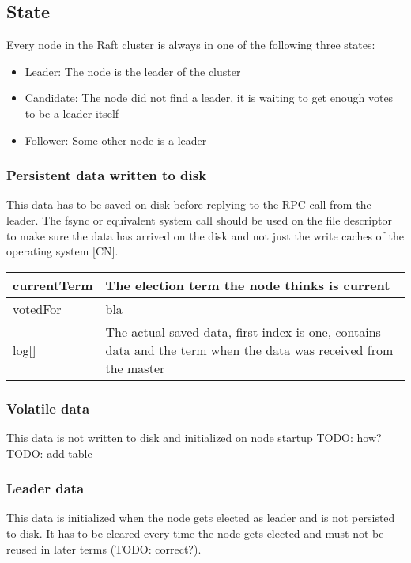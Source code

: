\subsection{State}
Every node in the Raft cluster is always in one of the following three states:
\begin{itemize}
    \item Leader: The node is the leader of the cluster
    \item Candidate: The node did not find a leader, it is waiting to get enough votes to be a leader itself
    \item Follower: Some other node is a leader
\end{itemize}

\subsubsection*{Persistent data written to disk}

This data has to be saved on disk before replying to the RPC call from the leader. The fsync or equivalent system call should be used on the file descriptor to make sure the data has arrived on the disk and not just the write caches of the operating system [CN].

\begin{tabular}{ | l | p{} | }
\hline
currentTerm & The election term the node thinks is current \\ \hline
votedFor & bla \\ \hline
log[] & The actual saved data, first index is one, contains data and the term when the data was received from the master \\ \hline
\end{tabular}

\subsubsection*{Volatile data}

This data is not written to disk and initialized on node startup
TODO: how?
TODO: add table

\subsubsection*{Leader data}

This data is initialized when the node gets elected as leader and is not persisted to disk.
It has to be cleared every time the node gets elected and must not be reused in later terms (TODO: correct?).

